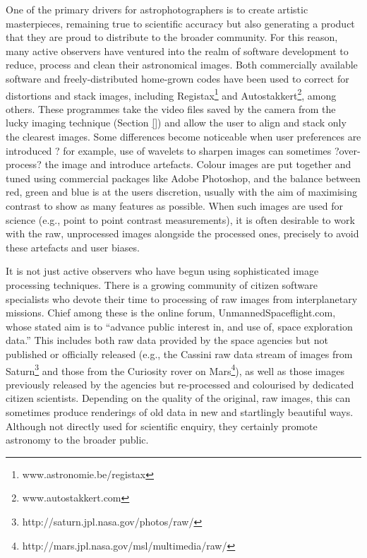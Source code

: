 \documentclass{ar2e}
\begin{document}
One of the primary drivers for astrophotographers is to create artistic
masterpieces, remaining true to scientific accuracy but also generating a
product that they are proud to distribute to the broader community.  For this
reason, many active observers have ventured into the realm of software
development to reduce, process and clean their astronomical images.  Both
commercially available software and freely-distributed home-grown codes have
been used to correct for distortions and stack images, including
Registax\footnote{www.astronomie.be/registax} and
Autostakkert\footnote{www.autostakkert.com}, among others.  These programmes
take the video files saved by the camera from the lucky imaging technique
(Section \ref{}) and allow the user to align and stack only the clearest
images.  Some differences become noticeable when user preferences are
introduced ? for example, use of wavelets to sharpen images can sometimes
?over-process? the image and introduce artefacts.  Colour images are put
together and tuned using commercial packages like Adobe Photoshop, and the
balance between red, green and blue is at the users discretion, usually with
the aim of maximising contrast to show as many features as possible.  When
such images are used for science (e.g., point to point contrast measurements),
it is often desirable to work with the raw, unprocessed images alongside the
processed ones, precisely to avoid these artefacts and user biases.

It is not just active observers who have begun using sophisticated image
processing techniques.  There is a growing community of citizen software
specialists who devote their time to processing of raw images from
interplanetary missions.  Chief among these is the online forum,
UnmannedSpaceflight.com, whose stated aim is to ``advance public interest in,
and use of, space exploration data.''  This includes both raw data provided by
the space agencies but not published or officially released (e.g., the Cassini
raw data stream of images from
Saturn\footnote{http://saturn.jpl.nasa.gov/photos/raw/} and those from the
Curiosity rover on Mars\footnote{
http://mars.jpl.nasa.gov/msl/multimedia/raw/}), as well as those images
previously released by the agencies but re-processed and colourised by
dedicated citizen scientists.  Depending on the quality of the original, raw
images, this can sometimes produce renderings of old data in new and
startlingly beautiful ways.  Although not directly used for scientific
enquiry, they certainly promote astronomy to the broader public.
\end{document}
